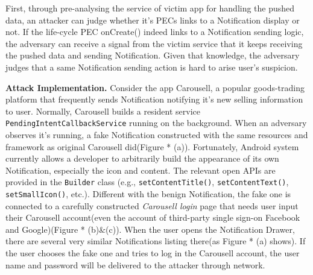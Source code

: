 First, through pre-analysing the service of victim app for handling the pushed data, an attacker can judge whether it's PECs links to a Notification display or not. If the life-cycle PEC onCreate() indeed links to a Notification sending logic, the adversary can receive a signal from the victim service that it keeps receiving the pushed data and sending Notification. Given that knowledge, the adversary judges that a same Notification sending action is hard to arise user's suspicion.   


\textbf{Attack Implementation.}
Consider the app Carousell, a popular goods-trading platform that frequently sends Notification notifying it's new selling information to user. Normally, Carousell builds a resident service \texttt{PendingIntentCallbackService} running on the background. When an adversary observes it's running, a fake Notification constructed with the same resources and framework as original Carousell did(Figure * (a)). Fortunately, Android system currently allows a developer to arbitrarily build the appearance of its own Notification, especially the icon and content. The relevant open APIs are provided in the \texttt{Builder} class (e.g., \texttt{setContentTitle()}, \texttt{setContentText()}, \texttt{setSmallIcon()}, etc.). Different with the benign Notification, the fake one is connected to a carefully constructed \textit{Carousell login} page that needs user input their Carousell account(even the account of third-party single sign-on Facebook and Google)(Figure * (b)\&(c)). When the user opens the Notification Drawer, there are several very similar Notifications listing there(as Figure * (a) shows). If the user chooses the fake one and tries to log in the Carousell account, the user name and password will be delivered to the attacker through network.



